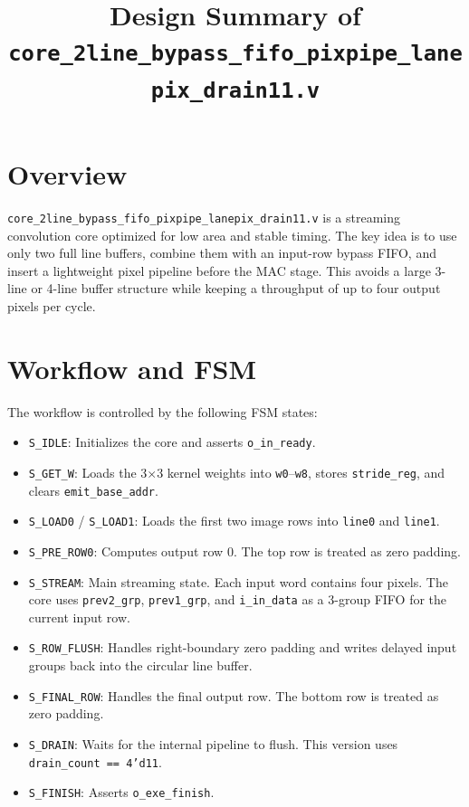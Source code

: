 \documentclass[11pt]{article}
\title{Design Summary of \texttt{core\_2line\_bypass\_fifo\_pixpipe\_lanepix\_drain11.v}}
\author{}
\date{}
\begin{document}
\maketitle

\section*{Overview}

\texttt{core\_2line\_bypass\_fifo\_pixpipe\_lanepix\_drain11.v} is a streaming convolution core optimized for low area and stable timing. The key idea is to use only two full line buffers, combine them with an input-row bypass FIFO, and insert a lightweight pixel pipeline before the MAC stage. This avoids a large 3-line or 4-line buffer structure while keeping a throughput of up to four output pixels per cycle.

\section*{Workflow and FSM}

The workflow is controlled by the following FSM states:

\begin{itemize}
  \item \texttt{S\_IDLE}: Initializes the core and asserts \texttt{o\_in\_ready}.
  \item \texttt{S\_GET\_W}: Loads the 3$\times$3 kernel weights into \texttt{w0}--\texttt{w8}, stores \texttt{stride\_reg}, and clears \texttt{emit\_base\_addr}.
  \item \texttt{S\_LOAD0} / \texttt{S\_LOAD1}: Loads the first two image rows into \texttt{line0} and \texttt{line1}.
  \item \texttt{S\_PRE\_ROW0}: Computes output row 0. The top row is treated as zero padding.
  \item \texttt{S\_STREAM}: Main streaming state. Each input word contains four pixels. The core uses \texttt{prev2\_grp}, \texttt{prev1\_grp}, and \texttt{i\_in\_data} as a 3-group FIFO for the current input row.
  \item \texttt{S\_ROW\_FLUSH}: Handles right-boundary zero padding and writes delayed input groups back into the circular line buffer.
  \item \texttt{S\_FINAL\_ROW}: Handles the final output row. The bottom row is treated as zero padding.
  \item \texttt{S\_DRAIN}: Waits for the internal pipeline to flush. This version uses \texttt{drain\_count == 4'd11}.
  \item \texttt{S\_FINISH}: Asserts \texttt{o\_exe\_finish}.
\end{itemize}
\end{document}
